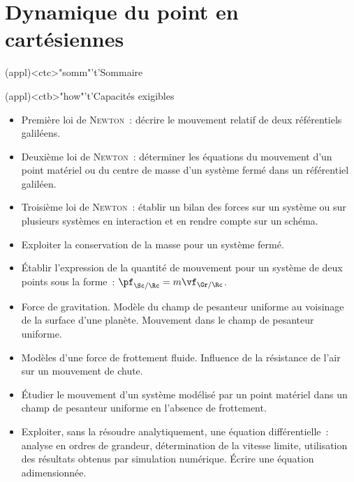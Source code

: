 \documentclass[../../main/main.tex]{subfiles}
\begin{document}
\setcounter{chapter}{1}


\chapter{Dynamique du point en cartésiennes}

\vspace*{\fill}

\begin{tcn}(appl)<ctc>"somm"'t'{Sommaire}
	\let\item\olditem
	\vspace{-15pt}
	\minitoc
	\vspace{-25pt}
\end{tcn}

\begin{tcn}[sidebyside]
	(appl)<ctb>"how"'t'{Capacités exigibles}
	\begin{itemize}[label=\rcheck]
		\item Première loi de \textsc{Newton}~: décrire le mouvement relatif de
		      deux référentiels galiléens.
		\item Deuxième loi de \textsc{Newton}~: déterminer les équations du
		      mouvement d'un point matériel ou du centre de masse d'un système
		      fermé dans un référentiel galiléen.
		\item Troisième loi de \textsc{Newton}~: établir un bilan des forces sur
		      un système ou sur plusieurs systèmes en interaction et en rendre
		      compte sur un schéma.
		\item Exploiter la conservation de la masse pour un système fermé.
		\item Établir l'expression de la quantité de mouvement pour un système de
		      deux points sous la forme~: $\pf_{\Sc/\Rc}=m\vf_{\Gr/\Rc}$.
	\end{itemize}
	\tcblower
	\begin{itemize}[label=\rcheck]
		\item Force de gravitation. Modèle du champ de pesanteur uniforme au
		      voisinage de la surface d'une planète. Mouvement dans le champ de
		      pesanteur uniforme.
		\item Modèles d'une force de frottement fluide. Influence de la résistance
		      de l'air sur un mouvement de chute.
		\item Étudier le mouvement d'un système modélisé par un point matériel
		      dans un champ de pesanteur uniforme en l'absence de frottement.
		\item Exploiter, sans la résoudre analytiquement, une équation
		      différentielle~: analyse en ordres de grandeur, détermination de la
		      vitesse limite, utilisation des résultats obtenus par simulation
		      numérique. Écrire une équation adimensionnée.
	\end{itemize}
\end{tcn}
\end{document}
